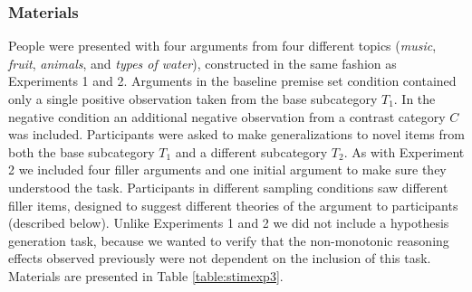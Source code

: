 \documentclass[authoryear,11pt]{elsarticle}
\begin{document}
\subsubsection{Materials}
People were presented with four arguments from four different topics ({\it music}, {\it fruit}, {\it animals}, and {\it types of water}), constructed in the same fashion as Experiments 1 and 2. Arguments in the {\sc baseline} premise set condition contained only a single positive observation taken from the base subcategory $T_1$. In the {\sc negative} condition an additional negative observation from a contrast category $C$ was included. Participants were asked to make generalizations to novel items from both the base subcategory $T_1$ and a different subcategory $T_2$. As with Experiment 2 we included four filler arguments and one initial argument to make sure they understood the task. Participants in different sampling conditions saw different filler items, designed to suggest different theories of the argument to participants (described below). Unlike Experiments 1 and 2 we did not include a hypothesis generation task, because we wanted to verify that the non-monotonic reasoning effects observed previously were not dependent on the inclusion of this task. Materials are presented in Table \ref{table:stimexp3}.
\end{document}
